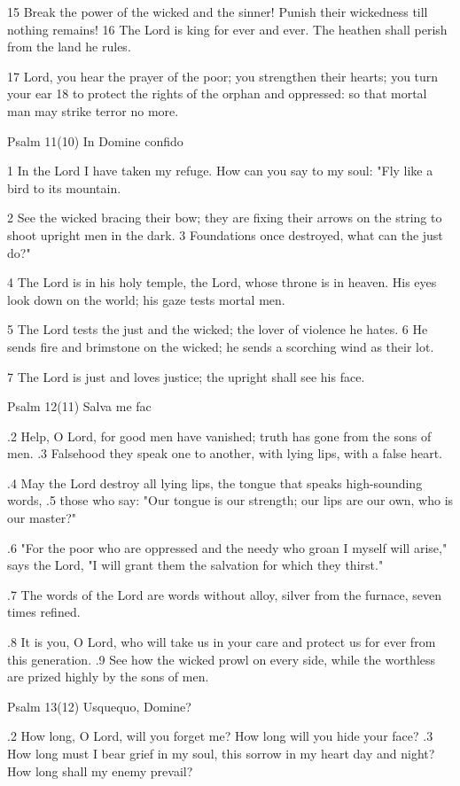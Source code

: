 15 Break the power of the wicked and the sinner!
Punish their wickedness till nothing remains!
16 The Lord is king for ever and ever.
The heathen shall perish from the land he rules.

17 Lord, you hear the prayer of the poor;
you strengthen their hearts; you turn your ear
18 to protect the rights of the orphan and oppressed:
so that mortal man may strike terror no more.



Psalm 11(10) In Domine confido

1 In the Lord I have taken my refuge.
How can you say to my soul:
"Fly like a bird to its mountain.

2 See the wicked bracing their bow;
they are fixing their arrows on the string
to shoot upright men in the dark.
3 Foundations once destroyed, what can the just do?"

4 The Lord is in his holy temple,
the Lord, whose throne is in heaven.
His eyes look down on the world;
his gaze tests mortal men.

5 The Lord tests the just and the wicked;
the lover of violence he hates.
6 He sends fire and brimstone on the wicked;
he sends a scorching wind as their lot.

7 The Lord is just and loves justice;
the upright shall see his face.


Psalm 12(11) Salva me fac

.2 Help, O Lord, for good men have vanished;
truth has gone from the sons of men.
.3 Falsehood they speak one to another,
with lying lips, with a false heart.

.4 May the Lord destroy all lying lips,
the tongue that speaks high-sounding words,
.5 those who say: "Our tongue is our strength;
our lips are our own, who is our master?"

.6 "For the poor who are oppressed and the needy who groan
I myself will arise," says the Lord,
"I will grant them the salvation for which they thirst."

.7 The words of the Lord are words without alloy,
silver from the furnace, seven times refined.

.8 It is you, O Lord, who will take us in your care
and protect us for ever from this generation.
.9 See how the wicked prowl on every side,
while the worthless are prized highly by the sons of men.


Psalm 13(12) Usquequo, Domine?

.2 How long, O Lord, will you forget me?
How long will you hide your face?
.3 How long must I bear grief in my soul,
this sorrow in my heart day and night?
How long shall my enemy prevail?

